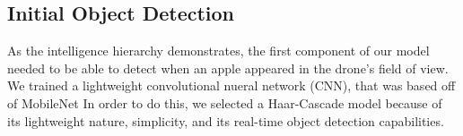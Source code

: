 \subsection{Initial Object Detection}
As the intelligence hierarchy demonstrates, the first component of our model needed to be able to detect when an apple appeared in the drone's field of view. 
We trained a lightweight convolutional nueral network (CNN), that was based off of MobileNet 
In order to do this, we selected a Haar-Cascade model because of its lightweight nature, simplicity, and its real-time object detection capabilities. 